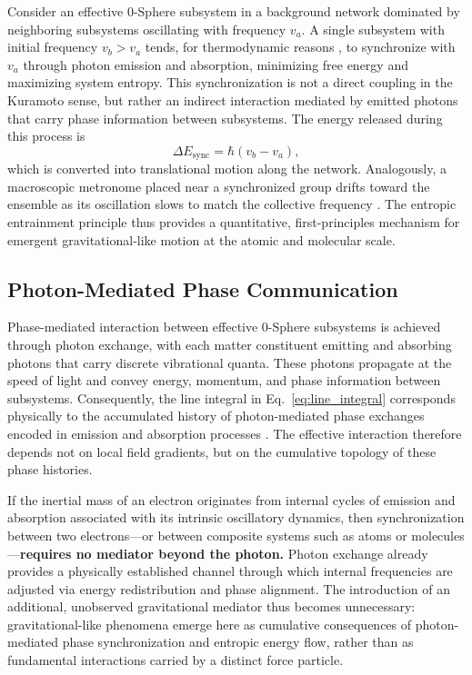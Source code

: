 \documentclass[
 reprint,
 amsmath,amssymb,
 aps,
 prb,
]{revtex4-2}
\numberwithin{equation}{section}
\begin{document}
Consider an effective 0-Sphere subsystem in a background network dominated by neighboring subsystems oscillating with frequency $v_a$. A single subsystem with initial frequency $v_b > v_a$ tends, for thermodynamic reasons \cite{Jacobson1995,Verlinde2011,Padmanabhan2010,Jaynes2003}, to synchronize with $v_a$ through photon emission and absorption, minimizing free energy and maximizing system entropy. This synchronization is not a direct coupling in the Kuramoto sense, but rather an indirect interaction mediated by emitted photons that carry phase information between subsystems. The energy released during this process is
\begin{equation}
\Delta E_\text{sync} = \hbar (v_b - v_a),
\label{eq:sync_energy}
\end{equation}
which is converted into translational motion along the network. Analogously, a macroscopic metronome placed near a synchronized group drifts toward the ensemble as its oscillation slows to match the collective frequency \cite{Bennett2002}. The entropic entrainment principle thus provides a quantitative, first-principles mechanism for emergent gravitational-like motion at the atomic and molecular scale.

\subsection{Photon-Mediated Phase Communication}

Phase-mediated interaction between effective 0-Sphere subsystems is achieved through photon exchange, with each matter constituent emitting and absorbing photons that carry discrete vibrational quanta. These photons propagate at the speed of light and convey energy, momentum, and phase information between subsystems. Consequently, the line integral in Eq.~\eqref{eq:line_integral} corresponds physically to the accumulated history of photon-mediated phase exchanges encoded in emission and absorption processes \cite{Hanamura2026Trilogy3}. The effective interaction therefore depends not on local field gradients, but on the cumulative topology of these phase histories.

If the inertial mass of an electron originates from internal cycles of emission and absorption associated with its intrinsic oscillatory dynamics, then synchronization between two electrons—or between composite systems such as atoms or molecules—\textbf{requires no mediator beyond the photon.} Photon exchange already provides a physically established channel through which internal frequencies are adjusted via energy redistribution and phase alignment. The introduction of an additional, unobserved gravitational mediator thus becomes unnecessary: gravitational-like phenomena emerge here as cumulative consequences of photon-mediated phase synchronization and entropic energy flow, rather than as fundamental interactions carried by a distinct force particle.
\end{document}
